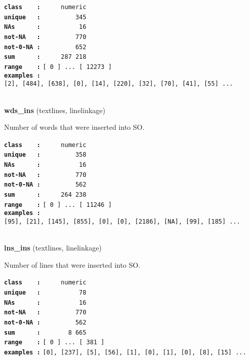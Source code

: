 \documentclass[]{article}
\begin{document}
\textbf{\texttt{class\ \ \ \ :}} \texttt{~~~~~numeric}\\
\textbf{\texttt{unique\ \ \ :}} \texttt{~~~~~~~~~345}\\
\textbf{\texttt{NAs\ \ \ \ \ \ :}} \texttt{~~~~~~~~~~16}\\
\textbf{\texttt{not-NA\ \ \ :}} \texttt{~~~~~~~~~770}\\
\textbf{\texttt{not-0-NA\ :}} \texttt{~~~~~~~~~652}\\
\textbf{\texttt{sum\ \ \ \ \ \ :}} \texttt{~~~~~287~218}\\
\textbf{\texttt{range\ \ \ \ :}}
\texttt{{[}\ 0\ {]}\ ...\ {[}\ 12273\ {]}}\\
\textbf{\texttt{examples\ :}}
\texttt{{[}2{]},\ {[}484{]},\ {[}638{]},\ {[}0{]},\ {[}14{]},\ {[}220{]},\ {[}32{]},\ {[}70{]},\ {[}41{]},\ {[}55{]}\ ...}\\

~

\textbf{wds\_ins} (textlines, linelinkage)

Number of words that were inserted into SO.

\textbf{\texttt{class\ \ \ \ :}} \texttt{~~~~~numeric}\\
\textbf{\texttt{unique\ \ \ :}} \texttt{~~~~~~~~~358}\\
\textbf{\texttt{NAs\ \ \ \ \ \ :}} \texttt{~~~~~~~~~~16}\\
\textbf{\texttt{not-NA\ \ \ :}} \texttt{~~~~~~~~~770}\\
\textbf{\texttt{not-0-NA\ :}} \texttt{~~~~~~~~~562}\\
\textbf{\texttt{sum\ \ \ \ \ \ :}} \texttt{~~~~~264~238}\\
\textbf{\texttt{range\ \ \ \ :}}
\texttt{{[}\ 0\ {]}\ ...\ {[}\ 11246\ {]}}\\
\textbf{\texttt{examples\ :}}
\texttt{{[}95{]},\ {[}21{]},\ {[}145{]},\ {[}855{]},\ {[}0{]},\ {[}0{]},\ {[}2186{]},\ {[}NA{]},\ {[}99{]},\ {[}185{]}\ ...}\\

~

\textbf{lns\_ins} (textlines, linelinkage)

Number of lines that were inserted into SO.

\textbf{\texttt{class\ \ \ \ :}} \texttt{~~~~~numeric}\\
\textbf{\texttt{unique\ \ \ :}} \texttt{~~~~~~~~~~78}\\
\textbf{\texttt{NAs\ \ \ \ \ \ :}} \texttt{~~~~~~~~~~16}\\
\textbf{\texttt{not-NA\ \ \ :}} \texttt{~~~~~~~~~770}\\
\textbf{\texttt{not-0-NA\ :}} \texttt{~~~~~~~~~562}\\
\textbf{\texttt{sum\ \ \ \ \ \ :}} \texttt{~~~~~~~8~665}\\
\textbf{\texttt{range\ \ \ \ :}}
\texttt{{[}\ 0\ {]}\ ...\ {[}\ 381\ {]}}\\
\textbf{\texttt{examples\ :}}
\texttt{{[}0{]},\ {[}237{]},\ {[}5{]},\ {[}56{]},\ {[}1{]},\ {[}0{]},\ {[}1{]},\ {[}0{]},\ {[}8{]},\ {[}15{]}\ ...}\\
\end{document}
